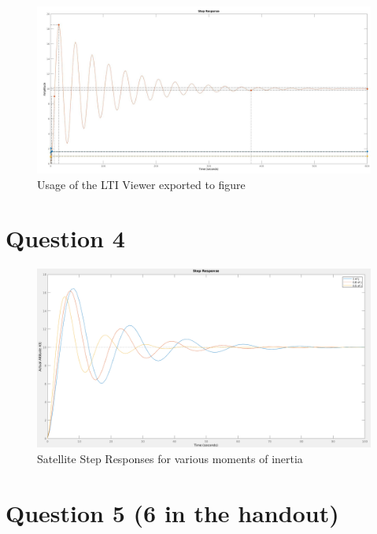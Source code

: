 \documentclass[a4paper, 12pt]{article}
\begin{document}
        \begin{figure}[!h]
            \centering
            \includegraphics[width=\textwidth]{q3.jpg}
            \caption{Usage of the LTI Viewer exported to figure}
            \label{fig:q3}
        \end{figure}

    \section{Question 4}

        

        \begin{figure}[!h]
            \centering
            \includegraphics[width=\textwidth]{q4.png}
            \caption{Satellite Step Responses for various moments of inertia}
            \label{fig:q4}
        \end{figure}

    \section{Question 5 (6 in the handout)}

        
\end{document}
